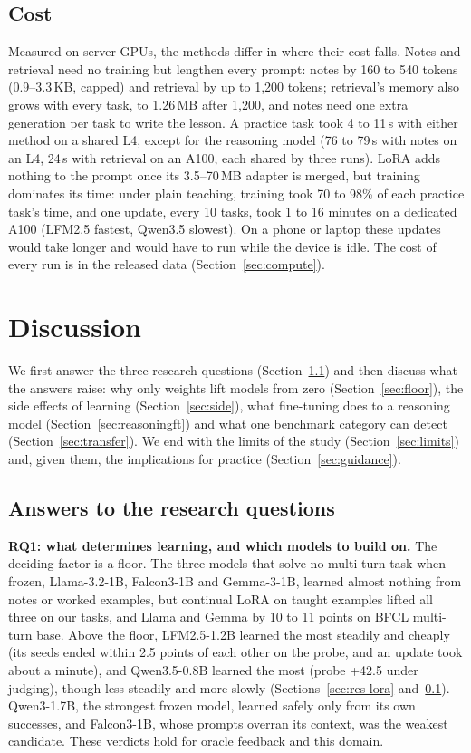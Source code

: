 \documentclass[a4paper,fleqn]{cas-dc}
\begin{document}
\subsection{Cost}\label{sec:res-cost}
Measured on server GPUs, the methods differ in where their cost falls. Notes and retrieval need no training but lengthen
every prompt: notes by 160 to 540 tokens (0.9--3.3\,KB, capped) and retrieval by up to 1,200 tokens; retrieval's memory
also grows with every task, to 1.26\,MB after 1,200, and notes need one extra generation per task to write the lesson. A
practice task took 4 to 11\,s with either method on a shared L4, except for the reasoning model (76 to 79\,s with
notes on an L4, 24\,s with retrieval on an A100, each shared by three runs). LoRA adds nothing to the prompt once its 3.5--70\,MB adapter is merged, but training
dominates its time: under plain teaching, training took 70 to 98\% of each practice task's time, and one update, every
10 tasks, took 1 to 16 minutes on a dedicated A100 (LFM2.5 fastest, Qwen3.5 slowest). On a phone or laptop these updates
would take longer and would have to run while the device is idle. The cost of every run is in the released data
(Section~\ref{sec:compute}).

\section{Discussion}\label{sec:discussion}
We first answer the three research questions (Section~\ref{sec:answers}) and then discuss what the answers raise: why only
weights lift models from zero (Section~\ref{sec:floor}), the side effects of learning (Section~\ref{sec:side}), what
fine-tuning does to a reasoning model (Section~\ref{sec:reasoningft}) and what one benchmark category can detect
(Section~\ref{sec:transfer}). We end with the limits of the study (Section~\ref{sec:limits}) and, given them, the
implications for practice (Section~\ref{sec:guidance}).

\subsection{Answers to the research questions}\label{sec:answers}
\textbf{RQ1: what determines learning, and which models to build on.} The deciding factor is a floor. The three
models that solve no multi-turn task when frozen, Llama-3.2-1B, Falcon3-1B and Gemma-3-1B, learned almost nothing from
notes or worked examples, but continual LoRA on taught examples lifted all three on our tasks, and Llama and Gemma by 10
to 11 points on BFCL multi-turn base. Above the floor, LFM2.5-1.2B learned the most steadily and cheaply (its seeds ended
within 2.5 points of each other on the probe, and an update took about a minute), and Qwen3.5-0.8B learned the most
(probe +42.5 under judging), though less steadily and more slowly (Sections~\ref{sec:res-lora} and~\ref{sec:res-cost}).
Qwen3-1.7B, the strongest frozen model, learned safely only from its own successes, and Falcon3-1B, whose prompts
overran its context, was the weakest candidate. These verdicts hold for oracle feedback and this domain.
\end{document}
